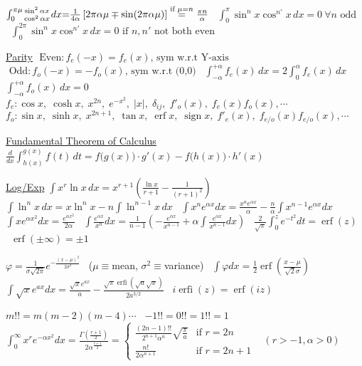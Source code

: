 {$\int_0^{\pi\mu}\!\genfrac{}{}{0pt}{}{\sin^2\alpha x}{\cos^2\alpha x}dx{=}\frac{1}{4\alpha}\left[2\pi\alpha\mu\mp\sin(2\pi\alpha\mu)\right]\stackrel{\text{if }\mu{=}n}{=}\frac{\pi n}{\alpha}$ \
$\int_0^\pi\!\sin^nx\cos^{n'}x\,dx{=}0\ \forall n\text{ odd}$ \
$\int_0^{2\pi}\!\sin^nx\cos^{n'}\!x\,dx{=}0\text{ if }n,n'\text{ not both even}$

\underline{Parity} 
$\text{ Even}: f_e(-x) = f_e(x)\text{, sym w.r.t Y-axis}$
$\text{ Odd}: f_o(-x) = -f_o(x)\text{, sym w.r.t (0,0)}$  
\
$\int_{-\alpha}^{+\alpha}\!f_e(x)\,dx{=}2\int_{0}^{\alpha}\!f_e(x)\,dx$
\;\;  $\int_{-\alpha}^{+\alpha}\!f_o(x)\,dx{=}0$ 
\  
\scriptsize{$f_e:  \cos x,\; \cosh x,\; x^{2n},\; e^{-x^2},\; |x|,\; \delta_{ij},\; f'_o(x), \; f_e (x) f_o (x), \cdots$} \ 
\scriptsize{$f_o:  \sin x,\; \sinh x,\; x^{2n+1},\; \tan x,\; \operatorname{erf}x,\; \operatorname{sign}x,\; f'_e(x),\; f_{e/o}(x)f_{e/o}(x), \cdots$}

\underline{Fundamental Theorem of Calculus}
$\frac{d}{dx}\int_{h(x)}^{g(x)} f(t) \, dt =  f\big(g(x)\big) \cdot g'(x) - f\big(h(x)\big) \cdot h'(x)$
\vspace{1pt}

\underline{Log/Exp} 
$\int\!x^r\ln x\,dx{=}x^{r+1}\left(\frac{\ln x}{r+1}{-}\frac{1}{(r+1)^2}\right)$ \
$\int\!\ln^nx\,dx{=}x\ln^n x{-}n\int\!\ln^{n-1}x\,dx$ \
$\int\!x^ne^{\alpha x}dx{=}\frac{x^ne^{\alpha x}}{\alpha}{-}\frac{n}{\alpha}\int\!x^{n-1}e^{\alpha x}dx$ \
$\int\!xe^{\alpha x^2}dx{=}\frac{e^{\alpha x^2}}{2\alpha}$ \
$\int\!\frac{e^{\alpha x}}{x^n}dx{=}\frac{1}{n{-}1}\left({-}\frac{e^{\alpha x}}{x^{n-1}}{+}\alpha\int\!\frac{e^{\alpha x}}{x^{n-1}}dx\right)$ \
$\frac{2}{\sqrt{\pi}}\int_0^ze^{-t^2}dt{=}\operatorname{erf}(z)$ \ $\operatorname{erf}(\pm \infty){=}\pm1$

$\varphi{=}\frac{1}{\sigma\sqrt{2\pi}}e^{-\frac{(x-\mu)^2}{2\sigma^2}}$ \ ($\mu{\equiv}$mean, $\sigma^2{\equiv}$variance) \
$\int\!\varphi dx{=}\frac{1}{2}\operatorname{erf}\left(\frac{x{-}\mu}{\sqrt{2}\sigma}\right)$ \
$\int\!\sqrt{x}e^{ax}dx{=}\frac{\sqrt{x}e^{ax}}{a}{-}\frac{\sqrt{\pi}\operatorname{erfi}(\sqrt{a}\sqrt{x})}{2a^{3/2}}$ \ $i\operatorname{erfi}(z){=}\operatorname{erf}(iz)$

$m!!{=}m(m{-}2)(m{-}4)\cdots$ \ ${-}1!!{=}0!!{=}1!!{=}1$ \
$\int_0^\infty\!x^re^{-\alpha x^2}dx{=}\frac{\Gamma\left(\frac{r+1}{2}\right)}{2\alpha^{\frac{r+1}{2}}}{=}\begin{cases}
\frac{(2n{-}1)!!}{2^{n+1}\alpha^n}\sqrt{\frac{\pi}{a}} & \text{if }r{=}2n \\
\frac{n!}{2\alpha^{n+1}} & \text{if }r{=}2n{+}1
\end{cases}$ \ {\scriptsize$(r{>}{-}1,\alpha{>}0)$}

}
